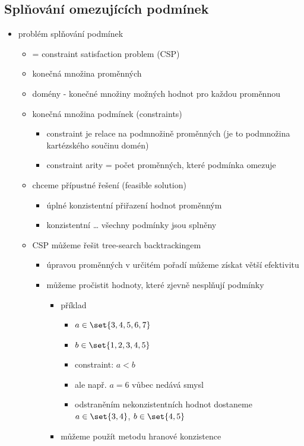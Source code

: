 \subsection{Splňování omezujících podmínek}
\begin{itemize}
\item problém splňování podmínek
\begin{itemize}
\item = constraint satisfaction problem (CSP)
\item konečná množina proměnných
\item domény - konečné množiny možných hodnot pro každou proměnnou
\item konečná množina podmínek (constraints)
\begin{itemize}
\item constraint je relace na podmnožině proměnných (je to podmnožina kartézského součinu domén)
\item constraint arity = počet proměnných, které podmínka omezuje
\end{itemize}
\item chceme přípustné řešení (feasible solution)
\begin{itemize}
\item úplné konzistentní přiřazení hodnot proměnným
\item konzistentní \dots{} všechny podmínky jsou splněny
\end{itemize}
\item CSP můžeme řešit tree-search backtrackingem
\begin{itemize}
\item úpravou proměnných v určitém pořadí můžeme získat větší efektivitu
\item můžeme pročistit hodnoty, které zjevně nesplňují podmínky
\begin{itemize}
\item příklad
\begin{itemize}
\item $a\in\set{3,4,5,6,7}$
\item $b\in\set{1,2,3,4,5}$
\item constraint: $a\lt b$
\item ale např. $a=6$ vůbec nedává smysl
\item odstraněním nekonzistentních hodnot dostaneme $a\in \set{3,4}$, $b\in\set{4,5}$
\end{itemize}
\item můžeme použít metodu hranové konzistence
\end{itemize}

\end{itemize}
\end{itemize}
\end{itemize}

